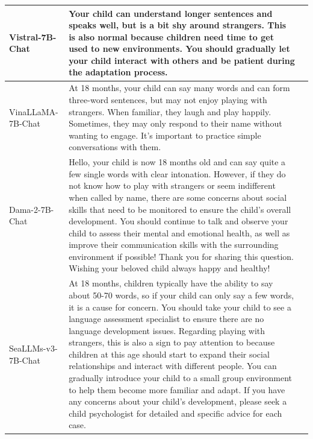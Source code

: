 \documentclass[runningheads]{llncs}
\begin{document}
\begin{longtable}{|>{\raggedright\arraybackslash}p{3cm}|>{\raggedright\arraybackslash}p{8cm}|>{\centering\arraybackslash}p{1.8cm}|}
Vistral-7B-Chat &  
Your child can understand longer sentences and speaks well, but is a bit shy around strangers. This is also normal because children need time to get used to new environments. You should gradually let your child interact with others and be patient during the adaptation process. & 
1.1 \\
\hline
VinaLLaMA-7B-Chat & 
At 18 months, your child can say many words and can form three-word sentences, but may not enjoy playing with strangers. When familiar, they laugh and play happily. Sometimes, they may only respond to their name without wanting to engage. It's important to practice simple conversations with them. & 
0.927 \\
\hline
Dama-2-7B-Chat & 
Hello, your child is now 18 months old and can say quite a few single words with clear intonation. However, if they do not know how to play with strangers or seem indifferent when called by name, there are some concerns about social skills that need to be monitored to ensure the child's overall development. You should continue to talk and observe your child to assess their mental and emotional health, as well as improve their communication skills with the surrounding environment if possible! Thank you for sharing this question. Wishing your beloved child always happy and healthy! &
2.207 \\
\hline
SeaLLMs-v3-7B-Chat & 
At 18 months, children typically have the ability to say about 50-70 words, so if your child can only say a few words, it is a cause for concern. You should take your child to see a language assessment specialist to ensure there are no language development issues. Regarding playing with strangers, this is also a sign to pay attention to because children at this age should start to expand their social relationships and interact with different people. You can gradually introduce your child to a small group environment to help them become more familiar and adapt. If you have any concerns about your child's development, please seek a child psychologist for detailed and specific advice for each case. &
2.703 \\
\hline

\end{longtable}
\end{document}
